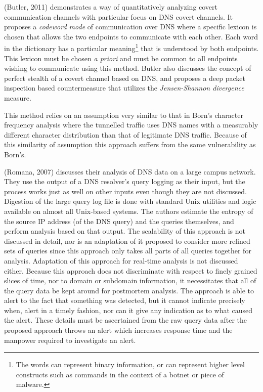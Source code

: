 \documentclass[12pt]{report}
\theoremstyle{remark}
\theoremstyle{definition}
\theoremstyle{definition}
\theoremstyle{definition}
\begin{document}
(Butler, 2011)\cite{Butler2011} demonstrates a way of quantitatively analyzing
covert communication channels with particular focus on DNS covert channels. It
proposes a \emph{codeword mode} of communication over DNS where a specific
lexicon is chosen that allows the two endpoints to communicate with each other.
Each word in the dictionary has a particular meaning\footnote{The words can
represent binary information, or can represent higher level constructs such as
commands in the context of a botnet or piece of malware.} that is understood by
both endpoints. This lexicon must be chosen \emph{a priori} and must be common
to all endpoints wishing to communicate using this method. Butler also discusses
the concept of perfect stealth of a covert channel based on DNS, and proposes a
deep packet inspection based countermeasure that utilizes the
\emph{Jensen-Shannon divergence} measure.

This method relies on an assumption very similar to that in Born's character
frequency analysis where the tunnelled traffic uses DNS names with a measurably
different character distribution than that of legitimate DNS traffic. Because of
this similarity of assumption this approach suffers from the same vulnerability
as Born's.

(Romana, 2007)\cite{Romana2007} discusses their analysis of DNS data on a large
campus network. They use the output of a DNS resolver's query logging as their
input, but the process works just as well on other inputs even though they are
not discussed. Digestion of the large query log file is done with standard Unix
utilities and logic available on almost all Unix-based systems. The authors
estimate the entropy of the source IP address (of the DNS query) and the queries
themselves, and perform analysis based on that output. The scalability of this
approach is not discussed in detail, nor is an adaptation of it proposed to
consider more refined sets of queries since this approach only takes all parts
of all queries together for analysis. Adaptation of this approach for real-time
analysis is not discussed either. Because this approach does not discriminate
with respect to finely grained slices of time, nor to domain or subdomain
information, it necessitates that all of the query data be kept around for
postmortem analysis. The approach is able to alert to the fact that something
was detected, but it cannot indicate precisely when, alert in a timely fashion,
nor can it give any indication as to what caused the alert. These details must
be ascertained from the raw query data after the proposed approach throws an
alert which increases response time and the manpower required to investigate an
alert.
\end{document}

